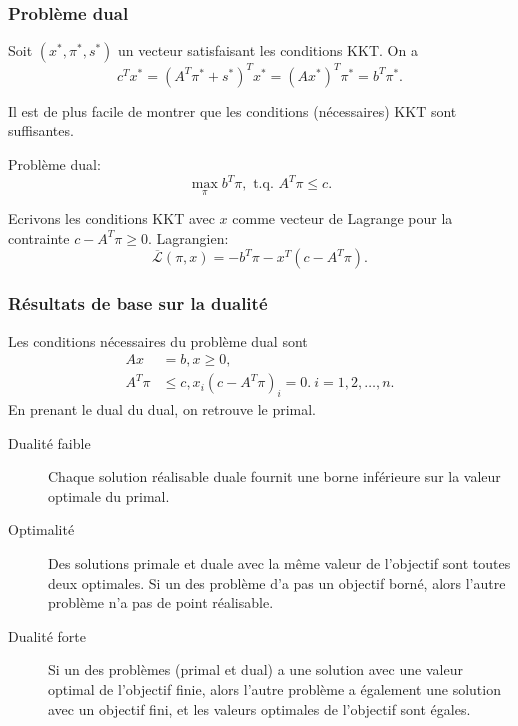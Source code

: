\begin{frame}
\frametitle{Problème dual}

Soit $(x^*, \pi^*, s^*)$ un vecteur satisfaisant les conditions
KKT. On a
\[
c^Tx^* = (A^T\pi^*+s^*)^Tx^* = (Ax^*)^T\pi^* = b^T\pi^*.
\]

Il est de plus facile de montrer que les conditions (nécessaires) KKT
sont suffisantes.

\mbox{}

{\red Problème dual}:
\[
\max_\pi b^T\pi, \mbox{ t.q. } A^T\pi \leq c.
\]

\mbox{}

Ecrivons les conditions KKT avec $x$ comme vecteur de Lagrange pour la
contrainte $c-A^T\pi \geq 0$. Lagrangien:
\[
\overline{\mathcal{L}}(\pi, x) = -b^T\pi - x^T(c-A^T\pi).
\]

\end{frame}

\begin{frame}
\frametitle{Résultats de base sur la dualité}

Les conditions nécessaires du problème dual sont
\begin{align*}
Ax &= b, x \geq 0, \\
A^T\pi &\leq c, x_i(c-A^T\pi)_i = 0.\ i = 1,2,\ldots,n.
\end{align*}
En prenant le dual du dual, on retrouve le primal.

\begin{description}
\item[Dualité faible]
Chaque solution réalisable duale fournit une borne inférieure sur la
valeur optimale du primal.
\item[Optimalité] Des solutions primale et duale avec la même valeur
  de l'objectif sont toutes deux optimales. Si un des problème d'a pas
  un objectif borné, alors l'autre problème n'a pas de point réalisable.
\item[Dualité forte] Si un des problèmes (primal et dual) a une
  solution avec une valeur optimal de l'objectif finie, alors l'autre
  problème a également une solution avec un objectif fini, et les
  valeurs optimales de l'objectif sont égales.
\end{description}

\end{frame}


